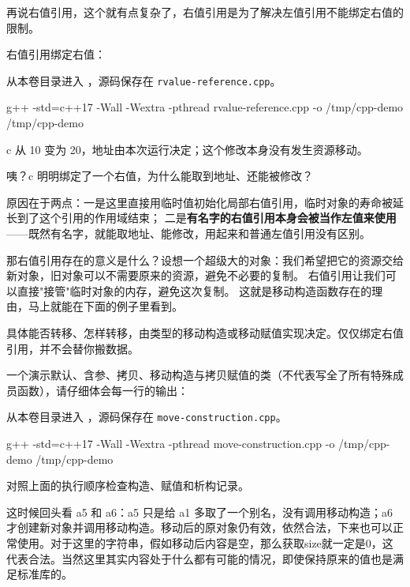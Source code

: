 再说右值引用，这个就有点复杂了，右值引用是为了解决左值引用不能绑定右值的限制。
\begin{example}
右值引用绑定右值：



从本卷目录进入 ，源码保存在 \texttt{rvalue-reference.cpp}。
\begin{tbash}
g++ -std=c++17 -Wall -Wextra -pthread rvalue-reference.cpp -o /tmp/cpp-demo
/tmp/cpp-demo
\end{tbash}
c 从 10 变为 20，地址由本次运行决定；这个修改本身没有发生资源移动。
\end{example}

咦？c 明明绑定了一个右值，为什么能取到地址、还能被修改？

原因在于两点：一是这里直接用临时值初始化局部右值引用，临时对象的寿命被延长到了这个引用的作用域结束；
二是\textbf{有名字的右值引用本身会被当作左值来使用}——既然有名字，就能取地址、能修改，用起来和普通左值引用没有区别。

那右值引用存在的意义是什么？设想一个超级大的对象：我们希望把它的资源交给新对象，旧对象可以不需要原来的资源，避免不必要的复制。
右值引用让我们可以直接"接管"临时对象的内存，避免这次复制。
这就是移动构造函数存在的理由，马上就能在下面的例子里看到。

\begin{note}
    具体能否转移、怎样转移，由类型的移动构造或移动赋值实现决定。仅仅绑定右值引用，并不会替你搬数据。
\end{note}

\begin{example}
一个演示默认、含参、拷贝、移动构造与拷贝赋值的类（不代表写全了所有特殊成员函数），请仔细体会每一行的输出：



从本卷目录进入 ，源码保存在 \texttt{move-construction.cpp}。
\begin{tbash}
g++ -std=c++17 -Wall -Wextra -pthread move-construction.cpp -o /tmp/cpp-demo
/tmp/cpp-demo
\end{tbash}
对照上面的执行顺序检查构造、赋值和析构记录。
\end{example}
这时候回头看 a5 和 a6：a5 只是给 a1 多取了一个别名，没有调用移动构造；a6 才创建新对象并调用移动构造。移动后的原对象仍有效，依然合法，下来也可以正常使用。对于这里的字符串，假如移动后内容是空，那么获取size就一定是0，这代表合法。当然这里其实内容处于什么都有可能的情况，即使保持原来的值也是满足标准库的。

